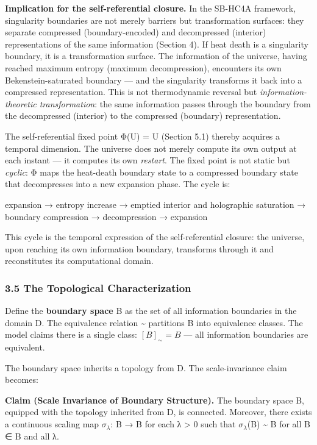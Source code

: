 \documentclass[
]{article}
\begin{document}
\textbf{Implication for the self-referential closure.} In the SB-HC4A
framework, singularity boundaries are not merely barriers but
transformation surfaces: they separate compressed (boundary-encoded) and
decompressed (interior) representations of the same information (Section
4). If heat death is a singularity boundary, it is a transformation
surface. The information of the universe, having reached maximum entropy
(maximum decompression), encounters its own Bekenstein-saturated
boundary --- and the singularity transforms it back into a compressed
representation. This is not thermodynamic reversal but
\emph{information-theoretic transformation}: the same information passes
through the boundary from the decompressed (interior) to the compressed
(boundary) representation.

The self-referential fixed point Φ(U) = U (Section 5.1) thereby acquires
a temporal dimension. The universe does not merely compute its own
output at each instant --- it computes its own \emph{restart}. The fixed
point is not static but \emph{cyclic}: Φ maps the heat-death boundary
state to a compressed boundary state that decompresses into a new
expansion phase. The cycle is:

expansion → entropy increase → emptied interior and holographic
saturation → boundary compression → decompression → expansion

This cycle is the temporal expression of the self-referential closure:
the universe, upon reaching its own information boundary, transforms
through it and reconstitutes its computational domain.

\hypertarget{the-topological-characterization}{%
\subsubsection{3.5 The Topological
Characterization}\label{the-topological-characterization}}

Define the \textbf{boundary space} B as the set of all information
boundaries in the domain D. The equivalence relation \textasciitilde{}
partitions B into equivalence classes. The model claims there is a
single class: \([B]_\sim = B\) --- all information boundaries are
equivalent.

The boundary space inherits a topology from D. The scale-invariance
claim becomes:

\textbf{Claim (Scale Invariance of Boundary Structure).} The boundary
space B, equipped with the topology inherited from D, is connected.
Moreover, there exists a continuous scaling map \(\sigma_{\lambda}\): B
→ B for each λ \textgreater{} 0 such that \(\sigma_{\lambda}\)(B)
\textasciitilde{} B for all B ∈ B and all λ.
\end{document}

